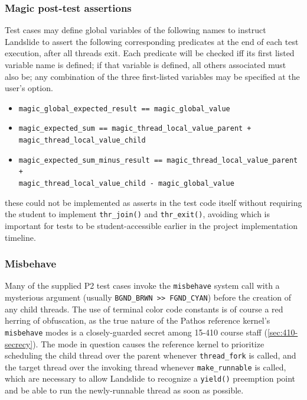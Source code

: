 \subsubsection{Magic post-test assertions}

Test cases may define global variables of the following names
to instruct Landslide to assert the following corresponding predicates at the end of each test execution,
after all threads exit.
Each predicate will be checked iff its first listed variable name is defined;
if that variable is defined, all others associated must also be;
any combination of the three first-listed variables may be specified at the user's option.
\begin{itemize}
	\item {\tt magic\_global\_expected\_result == magic\_global\_value}
	\item {\tt magic\_expected\_sum == magic\_thread\_local\_value\_parent +} \\ {\tt magic\_thread\_local\_value\_child}
	\item {\tt magic\_expected\_sum\_minus\_result == magic\_thread\_local\_value\_parent +} \\ {\tt magic\_thread\_local\_value\_child - magic\_global\_value}
\end{itemize}
these could not be implemented as asserts in the test code itself
without requiring the student to implement {\tt thr\_join()} and {\tt thr\_exit()},
avoiding which is important for tests to be student-accessible earlier in the project implementation timeline.

\subsubsection{Misbehave}
\label{sec:landslide-friendly-misbehave}

Many of the supplied P2 test cases invoke the {\tt misbehave} system call
with a mysterious argument (usually {\tt BGND\_BRWN >> FGND\_CYAN})
before the creation of any child threads.
The use of terminal color code constants is of course a red herring of obfuscation,
as the true nature of the Pathos reference kernel's {\tt misbehave} modes
is a closely-guarded secret among 15-410 course staff (\cref{sec:410-secrecy}).
The mode in question causes the reference kernel to prioritize scheduling the child thread over the parent
whenever {\tt thread\_fork} is called,
and the target thread over the invoking thread
whenever {\tt make\_runnable} is called,
which are necessary to allow Landslide to recognize a {\tt yield()} preemption point
and be able to run the newly-runnable thread as soon as possible.


